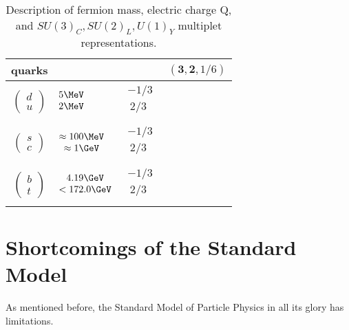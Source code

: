 \begin{table}[!htb]
\begin{tabular}{|cllc|}
\hline
\textbf{quarks}&&&$(\mathbf{3}, \mathbf{2}, 1/6)$\\
\hline 
$\begin{pmatrix} d\\ u \end{pmatrix}$
 &$\begin{matrix} 5\MeV\\  2\MeV \\ \end{matrix}$
  &$\begin{matrix} -1/3\\  ~2/3 \\ \end{matrix}$&\\  
\hline
$\begin{pmatrix} s\\ c \end{pmatrix}$
&$\begin{matrix}\approx100\MeV \\  \approx1\GeV \\ \end{matrix}$
  &$\begin{matrix} -1/3\\  ~2/3 \\ \end{matrix}$&\\  
  \hline
  $\begin{pmatrix} b\\ t \end{pmatrix}$
&$\begin{matrix} 4.19\GeV\\  <172.0\GeV \\ \end{matrix}$
  &$\begin{matrix} -1/3\\  ~2/3 \\ \end{matrix}$&\\  
\hline

\hline
\end{tabular}
\caption{Description of fermion mass, electric charge Q, and $SU(3)_{C}, SU(2)_{L}, U(1)_{Y}$ multiplet representations. }
\label{tab:fermion}
\end{table}  
\FloatBarrier

\section{Shortcomings of the Standard Model}
\label{sec:fail}
As mentioned before, the Standard Model of Particle Physics in all its glory has limitations.

